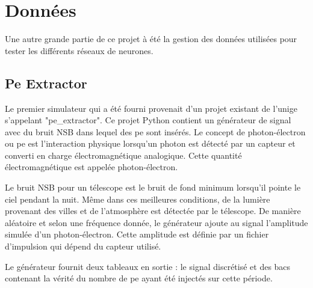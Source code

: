 







\section{Données}

Une autre grande partie de ce projet à été la gestion des données utilisées pour tester les différents réseaux de neurones.

\subsection{Pe Extractor}

Le premier simulateur qui a été fourni provenait d'un projet existant de l'\gls{unige} s'appelant "pe\_extractor".
Ce projet Python contient un générateur de signal avec du bruit NSB dans lequel des \gls{pe} sont insérés.
Le concept de photon-électron ou \gls{pe} est l'interaction physique lorsqu'un photon est détecté par un capteur et converti en charge électromagnétique analogique.
Cette quantité électromagnétique est appelée photon-électron.

Le bruit NSB pour un télescope est le bruit de fond minimum lorsqu'il pointe le ciel pendant la nuit. Même dans ces meilleures conditions,
de la lumière provenant des villes et de l'atmosphère est détectée par le télescope. 
De manière aléatoire et selon une fréquence donnée, le générateur ajoute au signal l'amplitude simulée d'un photon-électron.
Cette amplitude est définie par un fichier d'impulsion qui dépend du capteur utilisé.

Le générateur fournit deux tableaux en sortie : le signal discrétisé et des bacs contenant la vérité du nombre de \gls{pe} ayant été injectés sur cette période.

